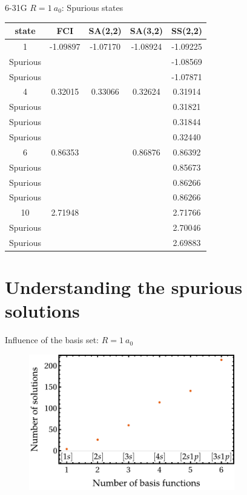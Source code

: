 \documentclass[10pt]{beamer}
\begin{document}
\begin{frame}{ 6-31G $R=1~a_0$: Spurious states}
  \begin{table}
    \label{tab:tab_3}
    \begin{tabular}{ccccc}
      state & FCI  & SA(2,2) & SA(3,2) & SS(2,2) \\
      \hline
      1 & -1.09897 & -1.07170 & -1.08924 & -1.09225 \\
      Spurious &  &  &  & -1.08569 \\
      Spurious &  &  &  & -1.07871 \\
      \hline
      4 & 0.32015 & 0.33066 & 0.32624 & 0.31914 \\
      Spurious &  &  &  & 0.31821 \\
      Spurious &  &  &  & 0.31844 \\
      Spurious &  &  &  & 0.32440 \\
      \hline
      6 & 0.86353 &  & 0.86876 & 0.86392 \\
      Spurious &  &  &  & 0.85673 \\
      Spurious &  &  &  & 0.86266 \\
      Spurious &  &  &  & 0.86266 \\
      \hline
      10 & 2.71948 &  &  & 2.71766 \\
      Spurious &  &  &  & 2.70046 \\
      Spurious &  &  &  & 2.69883 \\
    \end{tabular}
  \end{table}
\end{frame}

\section{Understanding the spurious solutions}

\begin{frame}{Influence of the basis set:  $R=1~a_0$}
  \begin{figure}
    \includegraphics[width=0.8\textwidth]{Figures/fig_3a.pdf}
  \end{figure}
\end{frame}
\end{document}
